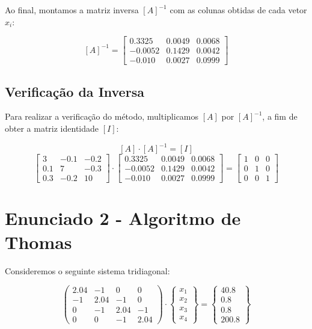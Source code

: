 \documentclass[12pt]{article}
\begin{document}
\newpage
Ao final, montamos a matriz inversa \([A]^{-1}\) com as colunas obtidas de cada vetor \(x_i\):

\[
[A]^{-1} = \begin{bmatrix}
    0.3325 & 0.0049 & 0.0068 \\
    -0.0052 & 0.1429 & 0.0042 \\
    -0.010 & 0.0027 & 0.0999
  \end{bmatrix}
\]

\subsection{Verificação da Inversa}
Para realizar a verificação do método, multiplicamos \([A]\) por \([A]^{-1}\), a fim de obter a matriz identidade \([I]\):

\[
[A] \cdot [A]^{-1} = [I]
\]
\[
\begin{bmatrix}
    3 & -0.1 & -0.2 \\
    0.1 & 7 & -0.3 \\
    0.3 & -0.2 & 10
  \end{bmatrix}
  \cdot
\begin{bmatrix}
    0.3325 & 0.0049 & 0.0068 \\
    -0.0052 & 0.1429 & 0.0042 \\
    -0.010 & 0.0027 & 0.0999
  \end{bmatrix} =
\begin{bmatrix}
    1 & 0 & 0 \\
    0 & 1 & 0 \\
    0 & 0 & 1
  \end{bmatrix}
\]

\section{Enunciado 2 - Algoritmo de Thomas}

Consideremos o seguinte sistema tridiagonal:

\[
\begin{pmatrix}
    2.04 & -1 & 0 & 0 \\
    -1 & 2.04 & -1 & 0\\
    0 & -1 & 2.04 & -1 \\
    0 & 0 & -1 & 2.04
\end{pmatrix}
\cdot
\begin{Bmatrix}
    x_1 \\
    x_2 \\
    x_3 \\
    x_4
\end{Bmatrix}
=
\begin{Bmatrix}
    40.8 \\
    0.8 \\
    0.8 \\
    200.8
\end{Bmatrix}
\]
\end{document}
